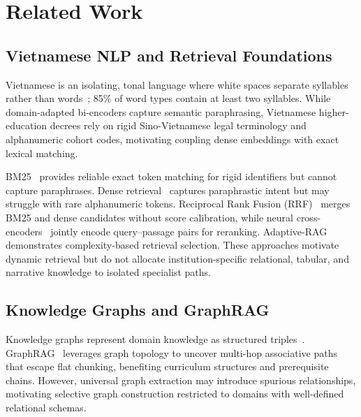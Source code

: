 \section{Related Work}
\label{sec:related}

\subsection{Vietnamese NLP and Retrieval Foundations}
\label{sec:vietnamese_nlp}

Vietnamese is an isolating, tonal language where white spaces separate syllables rather than words~\cite{nguyen2020phobert}; 85\% of word types contain at least two syllables. While domain-adapted bi-encoders capture semantic paraphrasing, Vietnamese higher-education decrees rely on rigid Sino-Vietnamese legal terminology and alphanumeric cohort codes, motivating coupling dense embeddings with exact lexical matching.

BM25~\cite{robertson2009bm25} provides reliable exact token matching for rigid identifiers but cannot capture paraphrases. Dense retrieval~\cite{karpukhin2020dpr,lewis2020rag} captures paraphrastic intent but may struggle with rare alphanumeric tokens. Reciprocal Rank Fusion (RRF)~\cite{cormack2009rrf} merges BM25 and dense candidates without score calibration, while neural cross-encoders~\cite{nogueira2019bert,xiao2023bge} jointly encode query--passage pairs for reranking. Adaptive-RAG~\cite{jeong2024adaptiverag} demonstrates complexity-based retrieval selection. These approaches motivate dynamic retrieval but do not allocate institution-specific relational, tabular, and narrative knowledge to isolated specialist paths.

\subsection{Knowledge Graphs and GraphRAG}
\label{sec:kg_graphrag}

Knowledge graphs represent domain knowledge as structured triples~\cite{pan2024unifying}. GraphRAG~\cite{edge2024graphrag} leverages graph topology to uncover multi-hop associative paths that escape flat chunking, benefiting curriculum structures and prerequisite chains. However, universal graph extraction may introduce spurious relationships, motivating selective graph construction restricted to domains with well-defined relational schemas.

